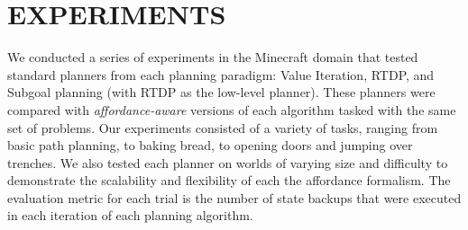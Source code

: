 \documentclass[]{article}
\newcommand{\stnote}[1]{\textcolor{Blue}{\textbf{ST: #1}}}
\newcommand{\jmnote}[1]{\textcolor{Green}{\textbf{JM: #1}}}
\begin{document}




\section{EXPERIMENTS}

%


We conducted a series of experiments in the Minecraft domain that
tested standard planners from each planning paradigm:
Value Iteration, RTDP, and Subgoal planning (with RTDP as the low-level
planner). These planners were compared with {\it affordance-aware}
versions of each algorithm tasked with the same set of problems. Our experiments consisted
of a variety of tasks, ranging from basic path planning, to baking bread, to opening doors 
and jumping over trenches.  We also tested each planner on worlds 
of varying size and difficulty to demonstrate the scalability and flexibility of each the affordance
formalism. The evaluation metric for each trial is the number of state backups that were 
executed in each iteration of each planning algorithm.
\end{document}
